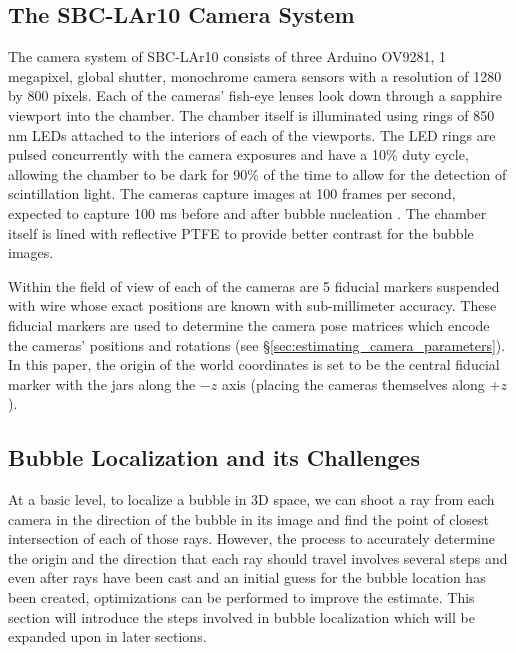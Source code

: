 \documentclass[11pt, letterpaper]{extarticle} %
\begin{document}
\subsection{The SBC-LAr10 Camera System} \label{subsec:the_sbc-lar10_camera_system}
The camera system of SBC-LAr10 consists of three Arduino OV9281, 1 megapixel, global shutter, monochrome camera sensors with a resolution of 1280 by 800 pixels. Each of the cameras' fish-eye lenses look down through a sapphire viewport into the chamber. The chamber itself is illuminated using rings of 850 nm LEDs attached to the interiors of each of the viewports. The LED rings are pulsed concurrently with the camera exposures and have a 10\% duty cycle, allowing the chamber to be dark for 90\% of the time to allow for the detection of scintillation light. The cameras capture images at 100 frames per second, expected to capture 100 ms before and after bubble nucleation \cite{alfonso2022snowmass}. The chamber itself is lined with reflective PTFE to provide better contrast for the bubble images.

Within the field of view of each of the cameras are 5 fiducial markers suspended with wire whose exact positions are known with sub-millimeter accuracy. These fiducial markers are used to determine the camera pose matrices which encode the cameras' positions and rotations (see \S\ref{sec:estimating_camera_parameters}). In this paper, the origin of the world coordinates is set to be the central fiducial marker with the jars along the $-z$ axis (placing the cameras themselves along $+z$).

\subsection{Bubble Localization and its Challenges} \label{subsec:bubble_localization_and_its_challenges}
At a basic level, to localize a bubble in 3D space, we can shoot a ray from each camera in the direction of the bubble in its image and find the point of closest intersection of each of those rays. However, the process to accurately determine the origin and the direction that each ray should travel involves several steps and even after rays have been cast and an initial guess for the bubble location has been created, optimizations can be performed to improve the estimate. This section will introduce the steps involved in bubble localization which will be expanded upon in later sections. 
 
\end{document}
